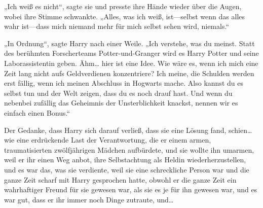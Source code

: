 „Ich weiß es nicht“, sagte sie und presste ihre Hände wieder über die Augen, wobei ihre Stimme schwankte. „Alles, was ich weiß, ist—selbst wenn das alles wahr ist—dass mich niemand mehr für mich selbst sehen wird, niemals.“

„In Ordnung“, sagte Harry nach einer Weile. „Ich verstehe, was du meinst. Statt des berühmten Forscherteams Potter-und-Granger wird es Harry Potter und seine Laborassistentin geben. Ähm… hier ist eine Idee. Wie wäre es, wenn ich mich eine Zeit lang nicht aufs Geldverdienen konzentriere? Ich meine, die Schulden werden erst fällig, wenn ich meinen Abschluss in Hogwarts mache. Also kannst du es selbst tun und der Welt zeigen, dass du es noch drauf hast. Und wenn du nebenbei zufällig das Geheimnis der Unsterblichkeit knackst, nennen wir es einfach einen Bonus.“

Der Gedanke, dass Harry sich darauf verließ, dass sie eine Lösung fand, schien…wie eine erdrückende Last der Verantwortung, die er einem armen, traumatisierten zwölfjährigen Mädchen aufbürdete, und sie wollte ihn umarmen, weil er ihr einen Weg anbot, ihre Selbstachtung als Heldin wiederherzustellen, und es war das, was sie verdiente, weil sie eine schreckliche Person war und die ganze Zeit scharf mit Harry gesprochen hatte, obwohl er die ganze Zeit ein wahrhaftiger Freund für sie gewesen war, als sie es je für ihn gewesen war, und es war gut, dass er ihr immer noch Dinge zutraute, und…

